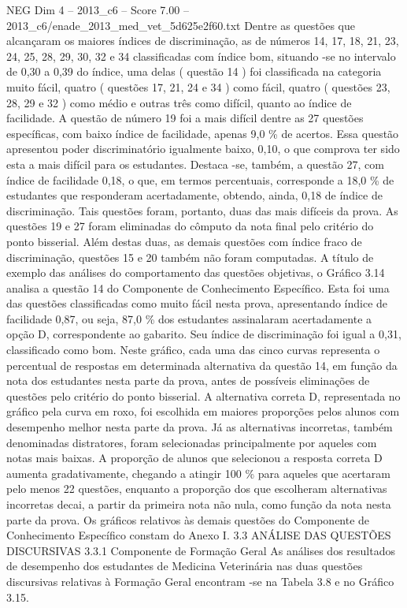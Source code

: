 \begin{textsample}{NEG Dim 4 – 2013\_c6 – Score 7.00 – 2013\_c6/enade\_2013\_med\_vet\_5d625e2f60.txt}
Dentre as questões que alcançaram os maiores índices de discriminação, as de números 14, 17, 18, 21, 23, 24, 25, 28, 29, 30, 32 e 34 classificadas com índice bom, situando -se no intervalo de 0,30 a 0,39 do índice, uma delas ( questão 14 ) foi classificada na categoria muito fácil, quatro ( questões 17, 21, 24 e 34 ) como fácil, quatro ( questões 23, 28, 29 e 32 ) como médio e outras três como difícil, quanto ao índice de facilidade.
A questão de número 19 foi a mais difícil dentre as 27 questões específicas, com baixo índice de facilidade, apenas 9,0 \% de acertos.
Essa questão apresentou poder discriminatório igualmente baixo, 0,10, o que comprova ter sido esta a mais difícil para os estudantes.
Destaca -se, também, a questão 27, com índice de facilidade 0,18, o que, em termos percentuais, corresponde a 18,0 \% de estudantes que responderam acertadamente, obtendo, ainda, 0,18 de índice de discriminação.
Tais questões foram, portanto, duas das mais difíceis da prova.
As questões 19 e 27 foram eliminadas do cômputo da nota final pelo critério do ponto bisserial.
Além destas duas, as demais questões com índice fraco de discriminação, questões 15 e 20 também não foram computadas.
A título de exemplo das análises do comportamento das questões objetivas, o Gráfico 3.14 analisa a questão 14 do Componente de Conhecimento Específico.
Esta foi uma das questões classificadas como muito fácil nesta prova, apresentando índice de facilidade 0,87, ou seja, 87,0 \% dos estudantes assinalaram acertadamente a opção D, correspondente ao gabarito.
Seu índice de discriminação foi igual a 0,31, classificado como bom.
Neste gráfico, cada uma das cinco curvas representa o percentual de respostas em determinada alternativa da questão 14, em função da nota dos estudantes nesta parte da prova, antes de possíveis eliminações de questões pelo critério do ponto bisserial.
A alternativa correta D, representada no gráfico pela curva em roxo, foi escolhida em maiores proporções pelos alunos com desempenho melhor nesta parte da prova.
Já as alternativas incorretas, também denominadas distratores, foram selecionadas principalmente por aqueles com notas mais baixas.
A proporção de alunos que selecionou a resposta correta D aumenta gradativamente, chegando a atingir 100 \% para aqueles que acertaram pelo menos 22 questões, enquanto a proporção dos que escolheram alternativas incorretas decai, a partir da primeira nota não nula, como função da nota nesta parte da prova.
Os gráficos relativos às demais questões do Componente de Conhecimento Específico constam do Anexo I. 3.3 ANÁLISE DAS QUESTÕES DISCURSIVAS 3.3.1 Componente de Formação Geral As análises dos resultados de desempenho dos estudantes de Medicina Veterinária nas duas questões discursivas relativas à Formação Geral encontram -se na Tabela 3.8 e no Gráfico 3.15.

\end{textsample}
